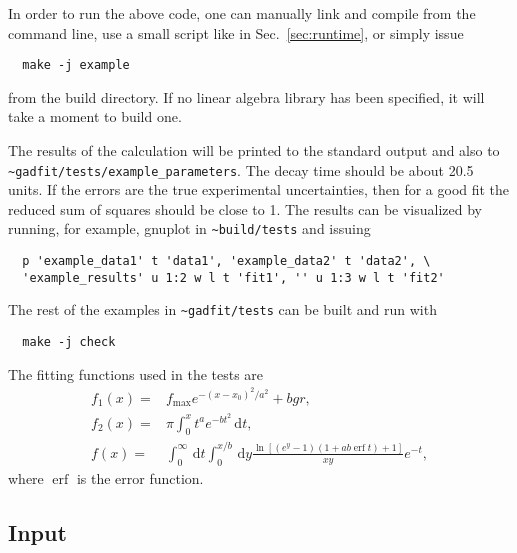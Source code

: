 \documentclass{article}
\newcommand{\D}{\,\textrm{d}}
\DeclareMathOperator{\erf}{erf}
\begin{document}
In order to run the above code, one can manually link and compile from the command line, use a small script like in Sec.~\ref{sec:runtime}, or simply issue
\begin{verbatim}
  make -j example
\end{verbatim}
from the build directory. If no linear algebra library has been specified, it will take a moment to build one.

The results of the calculation will be printed to the standard output and also to \verb+~gadfit/tests/example_parameters+. The decay time should be about 20.5 units. If the errors are the true experimental uncertainties, then for a good fit the reduced sum of squares should be close to 1. The results can be visualized by running, for example, gnuplot in \verb+~build/tests+ and issuing
\begin{verbatim}
  p 'example_data1' t 'data1', 'example_data2' t 'data2', \
  'example_results' u 1:2 w l t 'fit1', '' u 1:3 w l t 'fit2'
\end{verbatim}
The rest of the examples in \verb+~gadfit/tests+ can be built and run with
\begin{verbatim}
  make -j check
\end{verbatim}
The fitting functions used in the tests are
\begin{equation*}
  \begin{split}
    f_1(x) =& f_{\text{max}}e^{-(x-x_0)^2/a^2}+bgr, \\
    f_2(x) =& \pi \int_0^x t^ae^{-bt^2} \D t, \\
    f(x) =& \int_0^\infty \D t \int_0^{x/b} \D y
    \frac{\ln[(e^y-1)(1+ab \erf t)+1]}{xy} e^{-t},
  \end{split}
\end{equation*}
where $\erf$ is the error function.

\subsection{\label{sec:input}Input}
\end{document}
